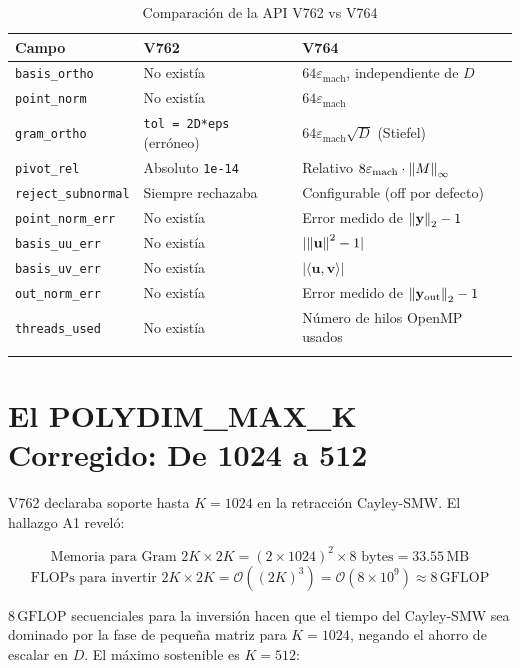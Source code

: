 \begin{longtable}{llp{7cm}}
\toprule
\textbf{Campo} & \textbf{V762} & \textbf{V764} \\
\midrule
\texttt{basis\_ortho} & No existía & $64\varepsilon_{\text{mach}}$, independiente de $D$ \\
\texttt{point\_norm} & No existía & $64\varepsilon_{\text{mach}}$ \\
\texttt{gram\_ortho} & \texttt{tol = 2D*eps} (erróneo) & $64\varepsilon_{\text{mach}}\sqrt{D}$ (Stiefel) \\
\texttt{pivot\_rel} & Absoluto \texttt{1e-14} & Relativo $8\varepsilon_{\text{mach}} \cdot \norm{M}_\infty$ \\
\texttt{reject\_subnormal} & Siempre rechazaba & Configurable (off por defecto) \\
\midrule
\texttt{point\_norm\_err} & No existía & Error medido de $\norm{\mathbf{y}}_2 - 1$ \\
\texttt{basis\_uu\_err} & No existía & $|\norm{\mathbf{u}}^2 - 1|$ \\
\texttt{basis\_uv\_err} & No existía & $|\langle\mathbf{u},\mathbf{v}\rangle|$ \\
\texttt{out\_norm\_err} & No existía & Error medido de $\norm{\mathbf{y}_{\text{out}}}_2 - 1$ \\
\texttt{threads\_used} & No existía & Número de hilos OpenMP usados \\
\bottomrule
\caption{Comparación de la API V762 vs V764}
\label{tab:api_comparacion}
\end{longtable}

\section{El POLYDIM\_MAX\_K Corregido: De 1024 a 512}

V762 declaraba soporte hasta $K = 1024$ en la retracción Cayley-SMW. El hallazgo A1 reveló:

\begin{equation}
\text{Memoria para Gram } 2K \times 2K = (2 \times 1024)^2 \times 8 \text{ bytes} = 33.55\,\text{MB}
\end{equation}
\begin{equation}
\text{FLOPs para invertir } 2K \times 2K = \mathcal{O}((2K)^3) = \mathcal{O}(8 \times 10^9) \approx 8\,\text{GFLOP}
\end{equation}

$8\,\text{GFLOP}$ secuenciales para la inversión hacen que el tiempo del Cayley-SMW
sea dominado por la fase de pequeña matriz para $K = 1024$, negando el ahorro de escalar
en $D$. El máximo sostenible es $K = 512$:

